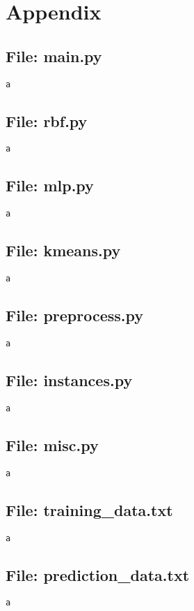 \documentclass{article}
\begin{document}
\section*{Appendix}
\subsection*{File: main.py}
\begin{verbatim}
a
\end{verbatim}

\subsection*{File: rbf.py}
\begin{verbatim}
a
\end{verbatim}

\subsection*{File: mlp.py}
\begin{verbatim}
a
\end{verbatim}

\subsection*{File: kmeans.py}
\begin{verbatim}
a
\end{verbatim}

\subsection*{File: preprocess.py}
\begin{verbatim}
a
\end{verbatim}

\subsection*{File: instances.py}
\begin{verbatim}
a
\end{verbatim}

\subsection*{File: misc.py}
\begin{verbatim}
a
\end{verbatim}

\subsection*{File: training\_data.txt}
\begin{verbatim}
a
\end{verbatim}

\subsection*{File: prediction\_data.txt}
\begin{verbatim}
a
\end{verbatim}
\end{document}
